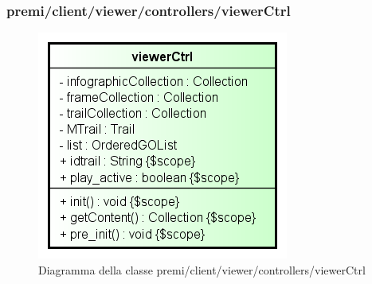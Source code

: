 \subsubsection{premi/client/viewer/controllers/viewerCtrl}
\begin{figure}[H]
\begin{center}
\includegraphics[scale=0.85]{img/diacla/viewerCtrl.png}
\caption{Diagramma della classe premi/client/viewer/controllers/viewerCtrl}
\end{center}
\end{figure}


